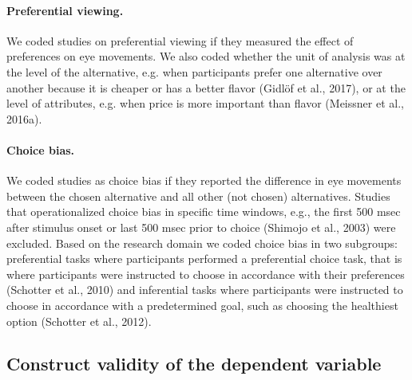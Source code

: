 \documentclass{article}
\begin{document}
\paragraph{Preferential viewing.} We coded studies on preferential viewing if they measured the effect of preferences on eye movements. We also coded whether the unit of analysis was at the level of the alternative, e.g. when participants prefer one alternative over another because it is cheaper or has a better flavor (Gidlöf et al., 2017), or at the level of attributes, e.g. when price is more important than flavor (Meissner et al., 2016a). 

\paragraph{Choice bias.} We coded studies as choice bias if they reported the difference in eye movements between the chosen alternative and all other (not chosen) alternatives. Studies that operationalized choice bias in specific time windows, e.g., the first 500 msec after stimulus onset or last 500 msec prior to choice (Shimojo et al., 2003) were excluded. Based on the research domain we coded choice bias in two subgroups: preferential tasks where participants performed a preferential choice task, that is where participants were instructed to choose in accordance with their preferences (Schotter et al., 2010) and inferential tasks where participants were instructed to choose in accordance with a predetermined goal, such as choosing the healthiest option (Schotter et al., 2012).


\subsection{Construct validity of the dependent variable}
\end{document}
